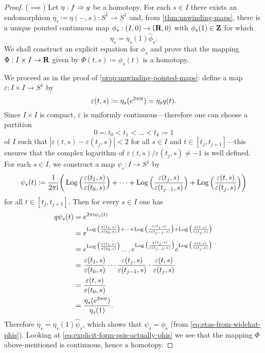 \begin{proof}
(\(\implies\)) Let \(\eta: f \Rightarrow g\) be a homotopy. For each \(s \in I\) there
exists an endomorphism \(\eta_s \coloneq \eta(-, s): S^1 \to S^1\) and, from
\cref{thm:unwinding-maps}, there is a unique pointed continuous map
\(\phi_s: (I, 0) \to (\mathbf{R}, 0)\) with \(\phi_s(1) \in \mathbf{Z}\) for which
\begin{equation}\label{eq:etas-from-widehat-phis}
\eta_s = \eta_s(1) \widehat \phi_s.
\end{equation}
We shall construct an explicit equation for \(\phi_s\) and prove that the
mapping \(\Phi: I \times I \to \mathbf{R}\) given by \(\Phi(t, s) \coloneq \phi_s(t)\)
is a homotopy.

We proceed as in the proof of \cref{prop:unwinding-pointed-maps}: define a map
\(\varepsilon: I \times I \to S^1\) by
\[
\varepsilon(t, s) \coloneq \eta_s(e^{2 \pi \text{i} t}) = \eta_s q(t).
\]
Since \(I \times I\) is compact, \(\varepsilon\) is uniformly
continuous---therefore one can choose a partition
\[
0 \eqqcolon t_0 < t_1 < \dots < t_k \coloneq 1
\]
of \(I\) such that \(|\varepsilon(t, s) - \varepsilon(t_j, s)| < 2\) for all
\(s \in I\) and \(t \in [t_j, t_{j+1}]\)---this ensures that the complex
logarithm of \(\varepsilon(t, s)/\varepsilon(t_j, s) \neq -1\) is well
defined. For each \(s \in I\), we construct a map \(\psi_s: I \to S^1\) by
\begin{equation}\label{eq:explicit-form-psis-actually-phis}
\psi_s(t) \coloneq \frac{1}{2 \pi \text{i}} \bigg(
\operatorname{Log} \Big( \frac{\varepsilon(t_1, s)}{\varepsilon(t_0, s)} \Big)
+ \dots +
\operatorname{Log} \Big( \frac{\varepsilon(t_j, s)}{\varepsilon(t_{j-1}, s)} \Big)
+ \operatorname{Log} \Big( \frac{\varepsilon(t, s)}{\varepsilon(t_j, s)} \Big)
\bigg)
\end{equation}
for all \(t \in [t_j, t_{j+1}]\). Then for every \(s \in I\) one has
\begin{align*}
q \psi_s(t) &= e^{2 \pi \text{i} \psi_s(t)} \\
&= e^{
  \operatorname{Log} \big( \frac{\varepsilon(t_1, s)}{\varepsilon(t_0, s)} \big)
  + \dots +
  \operatorname{Log} \big( \frac{\varepsilon(t_j, s)}{\varepsilon(t_{j-1}, s)} \big)
  + \operatorname{Log} \big( \frac{\varepsilon(t, s)}{\varepsilon(t_j, s)} \big)
} \\
&= e^{\operatorname{Log} \big( \frac{\varepsilon(t_1, s)}{\varepsilon(t_0, s)} \big)}
  \dots
  e^{\operatorname{Log} \big( \frac{\varepsilon(t_j, s)}{\varepsilon(t_{j-1}, s)} \big)}
  e^{\operatorname{Log} \big( \frac{\varepsilon(t, s)}{\varepsilon(t_j, s)} \big)} \\
&= \frac{\varepsilon(t_1, s)}{\varepsilon(t_0, s)}
  \cdots
  \frac{\varepsilon(t_j, s)}{\varepsilon(t_{j-1}, s)}
  \cdot
  \frac{\varepsilon(t, s)}{\varepsilon(t_j, s)} \\
&= \frac{\varepsilon(t, s)}{\varepsilon(t_0, s)} \\
&= \frac{\eta_s(e^{2 \pi \text{i} t})}{\eta_s(1)}.
\end{align*}
Therefore \(\eta_s = \eta_s(1) \widehat \psi_s\), which shows that
\(\psi_s = \phi_s\) (from \cref{eq:etas-from-widehat-phis}). Looking at
\cref{eq:explicit-form-psis-actually-phis} we see that the mapping \(\Phi\)
above-mentioned is continuous, hence a homotopy.


\end{proof}
